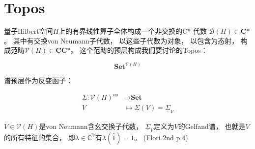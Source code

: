 \documentclass[10pt, openany]{book}
\begin{document}
\section{Topos}

量子Hilbert空间$H$上的有界线性算子全体构成一个非交换的C*-代数
$\mathcal B(H) \in \textbf{C*}$。
其中有交换von Neumann子代数，
以这些子代数为对象，
以包含为态射，
构成范畴$\mathcal V(H) \in \textbf{CC*}$。
这个范畴的预层构成我们要讨论的Topos：

$$
\textbf{Set}^{\mathcal V(H)}
$$

谱预层作为反变函子：

$$
\begin{aligned}
\underline{\Sigma}: \mathcal V(H)^\text{op} &\to \textbf{Set} \\
V &\mapsto \underline{\Sigma}(V) = \underline{\Sigma}_V 
\end{aligned}
$$

$V\in\mathcal V(H)$是von Neumann含幺交换子代数，
$\underline{\Sigma}_V$定义为$V$的Gelfand谱，
也就是$V$的所有特征的集合，
即$\lambda \in \mathbb C^V$有$\lambda(\hat 1)=1$。
(Flori 2nd p.4)

\backmatter



\end{document}
